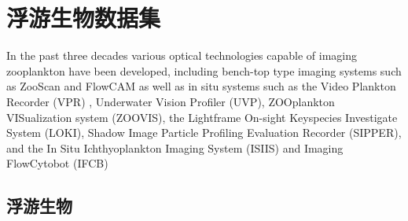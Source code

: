 \section{浮游生物数据集}




In the past three decades various optical technologies capable of imaging zooplankton have been developed, including bench-top type imaging systems such as ZooScan and FlowCAM as well as in situ systems such as the Video Plankton Recorder (VPR) , Underwater Vision Profiler (UVP), ZOOplankton VISualization system (ZOOVIS), the Lightframe On-sight Keyspecies Investigate System (LOKI), Shadow Image Particle Profiling Evaluation Recorder (SIPPER), and the In Situ Ichthyoplankton Imaging System (ISIIS)\cite{bi2014semi} and Imaging FlowCytobot (IFCB)


\subsection{浮游生物}

